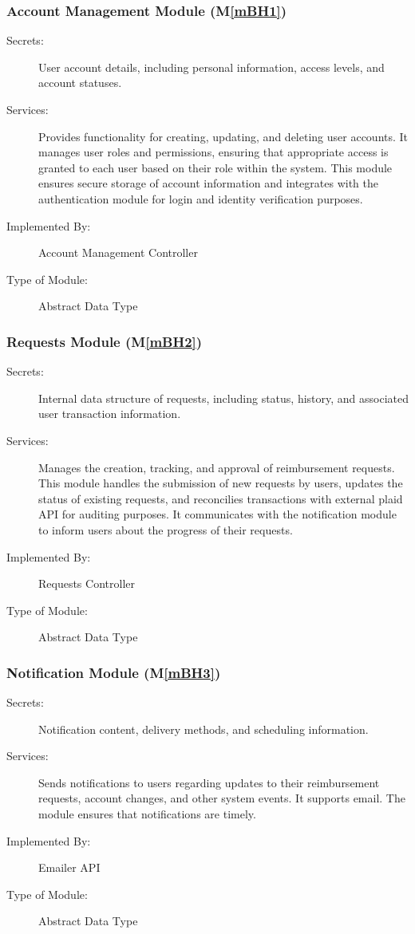 \documentclass[12pt, titlepage]{article}
\newcommand{\mref}[1]{M\ref{#1}}
\begin{document}
\subsubsection{Account Management Module (\mref{mBH1})}

\begin{description}
\item[Secrets:] User account details, including personal information, access levels, and account statuses.
\item[Services:] Provides functionality for creating, updating, and deleting user accounts. It manages user roles and permissions, ensuring that appropriate access is granted to each user based on their role within the system. This module ensures secure storage of account information and integrates with the authentication module for login and identity verification purposes.
\item[Implemented By:] Account Management Controller
\item[Type of Module:] Abstract Data Type
\end{description}

\subsubsection{Requests Module (\mref{mBH2})}

\begin{description}
\item[Secrets:] Internal data structure of requests, including status, history, and associated user transaction information.
\item[Services:] Manages the creation, tracking, and approval of reimbursement requests. This module handles the submission of new requests by users, updates the status of existing requests, and reconcilies transactions with external plaid API for auditing purposes. It communicates with the notification module to inform users about the progress of their requests.
\item[Implemented By:] Requests Controller
\item[Type of Module:] Abstract Data Type
\end{description}

\subsubsection{Notification Module (\mref{mBH3})}

\begin{description}
\item[Secrets:] Notification content, delivery methods, and scheduling information.
\item[Services:] Sends notifications to users regarding updates to their reimbursement requests, account changes, and other system events. It supports email. The module ensures that notifications are timely.
\item[Implemented By:] Emailer API
\item[Type of Module:] Abstract Data Type
\end{description}
\end{document}
